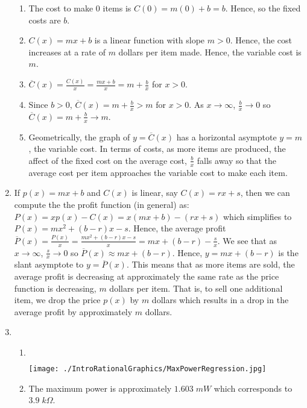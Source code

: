 \documentclass{ximera}
\begin{document}
\begin{enumerate}
\begin{enumerate}
\item  The cost to make $0$ items is $C(0) = m(0)+b = b$.  Hence,  so the fixed costs are $b$.
\item $C(x) = mx+b$ is a linear function with slope $m>0$.  Hence, the cost increases at a rate of $m$ dollars per item made.  Hence, the variable cost is $m$.
\item  $\overline{C}(x) = \frac{C(x)}{x} = \frac{mx+b}{x} = m + \frac{b}{x}$ for $x > 0$.
\item  Since $b>0$,  $\overline{C}(x)  = m + \frac{b}{x} > m$ for $x > 0$. As $x \rightarrow \infty$, $\frac{b}{x} \rightarrow 0$ so $\overline{C}(x)  = m + \frac{b}{x} \rightarrow m$.
\item Geometrically, the graph of $y = \overline{C}(x)$ has a horizontal asymptote $y = m$, the variable cost.  In terms of costs, as more items are produced, the affect of the fixed cost on the average cost, $\frac{b}{x}$ falls away so that the average cost per item approaches the variable cost to make each item.

\end{enumerate}

\item   If $p(x) = mx + b$ and $C(x)$ is linear, say $C(x) = rx+s$, then we can compute the the profit function (in general) as: $P(x) = xp(x) - C(x) = x(mx+b) - (rx+s)$ which simplifies to $P(x) = mx^2 + (b-r)x -s$.  Hence, the average profit $\overline{P}(x) = \frac{P(x)}{x} = \frac{mx^2 + (b-r)x -s}{x} = mx + (b-r) - \frac{s}{x}$.  We see that as $x \rightarrow \infty$, $\frac{s}{x} \rightarrow 0$ so $\overline{P}(x) \approx mx  + (b-r)$.  Hence, $y = mx + (b-r)$ is the slant asymptote  to $y = \overline{P}(x)$.  This means that as more items are sold, the average profit is decreasing at approximately the same rate as the price function is decreasing, $m$ dollars per item.  That is, to sell one additional item, we drop the price $p(x)$ by $m$ dollars which results in a drop in the average profit by approximately $m$ dollars.

\pagebreak


\item \begin{enumerate}

\item $~$

\texttt{[image: ./IntroRationalGraphics/MaxPowerRegression.jpg]}

\item The maximum power is approximately $1.603 \; mW$ which corresponds to $3.9 \; k\Omega$.


\end{enumerate}
\end{enumerate}
\end{document}
